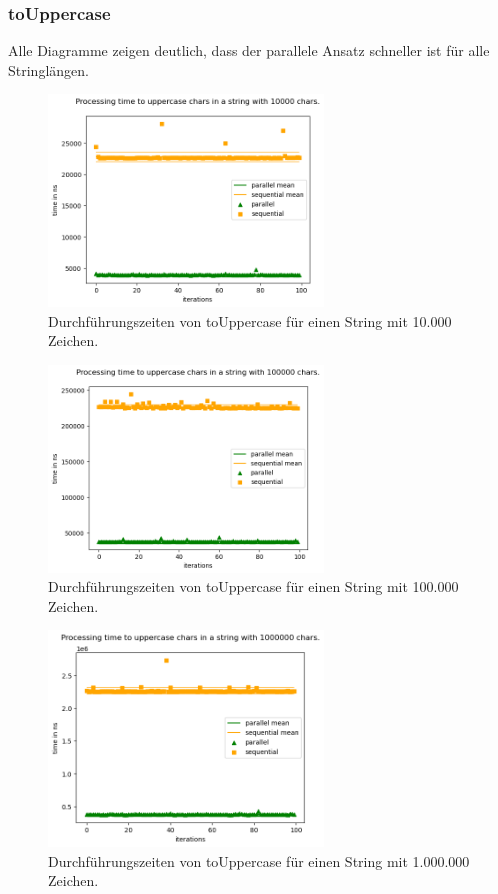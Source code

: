 \documentclass[plainarticle,zihtitle,german,final,hyperref,utf8]{zihpub}
\begin{document}
\subsubsection{toUppercase}
Alle Diagramme zeigen deutlich, dass der parallele Ansatz schneller ist für alle Stringlängen.
\begin{figure}[h]
	\begin{center}
		\includegraphics[width=0.65\textwidth]{images/comp_upper_10000.png}
		\caption{Durchführungszeiten von toUppercase für einen String mit 10.000 Zeichen.}
	\end{center}
\end{figure}
\begin{figure}[h]
\begin{center}
	\includegraphics[width=0.65\textwidth]{images/comp_upper_100000.png}
	\caption{Durchführungszeiten von toUppercase für einen String mit 100.000 Zeichen.}
\end{center}
\end{figure}
\begin{figure}[h]
\begin{center}
	\includegraphics[width=0.65\textwidth]{images/comp_upper_1000000.png}
	\caption{Durchführungszeiten von toUppercase für einen String mit 1.000.000 Zeichen.}
\end{center}
\end{figure}
\end{document}

